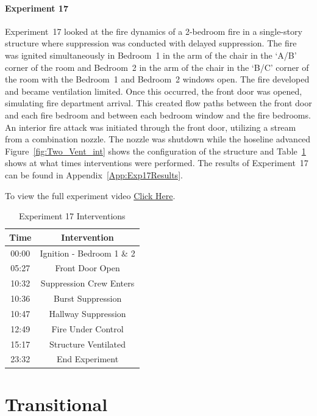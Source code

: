 \documentclass[12pt,oneside]{book}
\begin{document}
\paragraph{Experiment 17}
Experiment~17 looked at the fire dynamics of a 2-bedroom fire in a single-story structure where suppression was conducted with delayed suppression. The fire was ignited simultaneously in Bedroom~1 in the arm of the chair in the `A/B' corner of the room and Bedroom~2 in the arm of the chair in the `B/C' corner of the room with the Bedroom~1 and Bedroom~2 windows open. The fire developed and became ventilation limited. Once this occurred, the front door was opened, simulating fire department arrival. This created flow paths between the front door and each fire bedroom and between each bedroom window and the fire bedrooms. An interior fire attack was initiated through the front door, utilizing a stream from a combination nozzle. The nozzle was shutdown while the hoseline advanced Figure~\ref{fig:Two_Vent_int} shows the configuration of the structure and Table~\ref{Table:Exp17Interventions} shows at what times interventions were performed. The results of Experiment~17 can be found in Appendix~\ref{App:Exp17Results}. 

To view the full experiment video \href{https://player.vimeo.com/video/170499615?autoplay=1}{Click Here}.

\begin{table}[H]
	\centering
	\caption{Experiment 17 Interventions}
	\begin{tabular}{|c|c|} 
		\hline
		Time & Intervention \\ \hline \hline
		00:00 & Ignition - Bedroom 1 \& 2 \\ \hline
		05:27 & Front Door Open \\ \hline
		10:32 & Suppression Crew Enters\\ \hline
		10:36 & Burst Suppression \\ \hline 
		10:47 & Hallway Suppression \\ \hline
		12:49 & Fire Under Control \\ \hline
		15:17 & Structure Ventilated \\ \hline
		23:32 & End Experiment\\ \hline
	\end{tabular}
	\label{Table:Exp17Interventions}
\end{table}

\clearpage

\section{Transitional}
\end{document}
